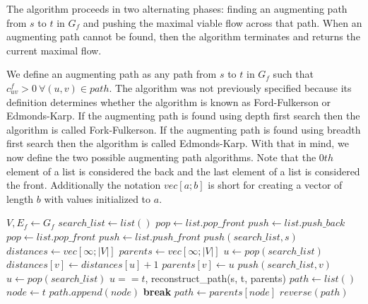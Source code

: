 \documentclass{acm_proc_article-sp}
\begin{document}
The algorithm proceeds in two alternating phases: finding an augmenting path from $s$ to $t$ in $G_f$ and pushing the maximal viable flow across that path. When an augmenting path cannot be found, then the algorithm terminates and returns the current maximal flow.

We define an augmenting path as any path from $s$ to $t$ in $G_f$ such that $c^f_{uv}>0\ \forall (u,v)\in path$. The algorithm was not previously specified because its definition determines whether the algorithm is known as Ford-Fulkerson or Edmonds-Karp. If the augmenting path is found using depth first search then the algorithm is called Fork-Fulkerson. If the augmenting path is found using breadth first search then the algorithm is called Edmonds-Karp. With that in mind, we now define the two possible augmenting path algorithms. Note that the $0th$ element of a list is considered the back and the last element of a list is considered the front. Additionally the notation $vec[a;b]$ is short for creating a vector of length $b$ with values initialized to $a$.

\begin{algorithm}
\begin{algorithmic}[1]
\label{ap-algorithm}
\State $V, E_f\gets G_f$
\State $search\_list \gets list()$
\State $pop \gets list.pop\_front$
\State $push \gets list.push\_back$
\Else
\State $pop \gets list.pop\_front$
\State $push \gets list.push\_front$
\EndIf
\State $push(search\_list, s)$
\State $distances\gets vec[\infty; |V|]$
\State $parents\gets vec[\infty; |V|]$
\State $u\gets pop(search\_list)$
\State $distances[v]\gets distances[u] + 1$
\State $parents[v]\gets u$
\State $push(search\_list, v)$
\EndIf
\EndFor
\State $u\gets pop(search\_list)$
\EndWhile
\State\Return $u == t$, reconstruct\_path(s, t, parents)
\EndFunction
\Statex
{}
\State $path\gets list()$
\State $node\gets t$
\Loop
\State $path.append(node)$
\State \textbf{break}
\EndIf
\State $path\gets parents[node]$
\EndLoop
\State\Return $reverse(path)$
\EndFunction
\end{algorithmic}
\end{algorithm}





\end{document}
